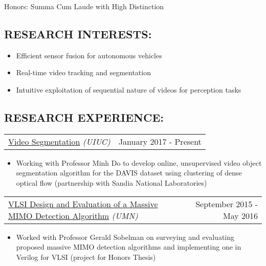 \documentclass[10pt, letterpaper]{article}
\makeatletter
\newcommand{\headerrow}[2]
{\begin{tabular*}{\linewidth}{l@{\extracolsep{\fill}}r}
	#1 &
	#2 \\
\end{tabular*}}
\newcommand{\sansserif}{\cabin}
\makeatother
\begin{document}
Honors: Summa Cum Laude with High Distinction

\begin{comment}
\subsection*{\sansserif SKILLS:}
Python with TensorFlow and Caffe expeirience, MATLAB, C, Microsoft Office Suite, \LaTeX
\end{comment}

\subsection*{\sansserif RESEARCH INTERESTS:}
\begin{itemize}
	\item Efficient sensor fusion for autonomous vehicles
	\item Real-time video tracking and segmentation
	\item Intuitive exploitation of sequential nature of videos for perception tasks
\end{itemize}

\subsection*{\sansserif RESEARCH EXPERIENCE:}

\headerrow
	{\uline{Video Segmentation} \textit{(UIUC)}}
	{January 2017 - Present}
	\begin{itemize}
		\item
		Working with Professor Minh Do to develop online, unsupervised video object segmentation algorithm for the DAVIS dataset using clustering of dense optical flow (partnership with Sandia National Laboratories)	
	\end{itemize}

\headerrow
	{\uline{VLSI Design and Evaluation of a Massive MIMO Detection Algorithm} \textit{(UMN)}}
	{September 2015 - May 2016}
	\begin{itemize}
		\item
		Worked with Professor Gerald Sobelman on surveying and evaluating proposed massive MIMO detection algorithms and implementing one in Verilog for VLSI (project for Honors Thesis) 
	\end{itemize}

\end{document}

